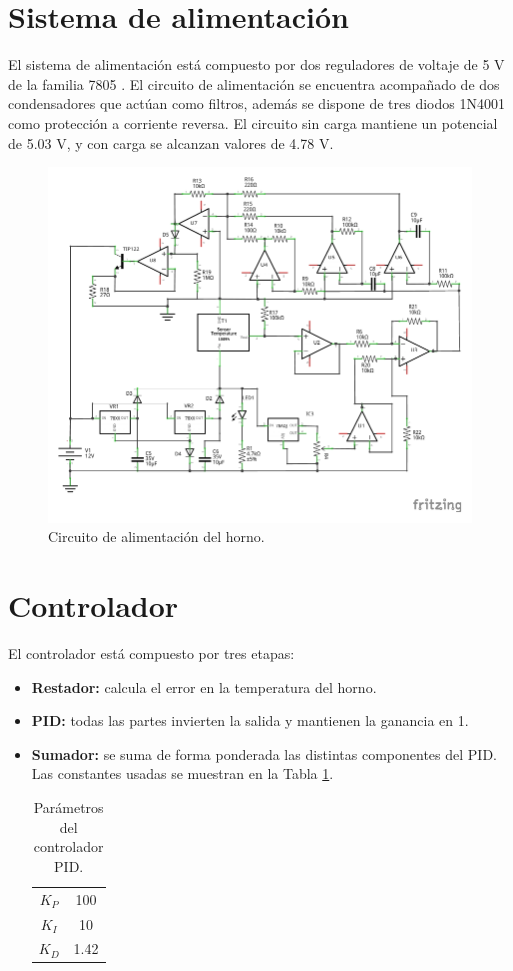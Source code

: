\documentclass{wileysix}
\begin{document}
\section{Sistema de alimentaci\'on}
El sistema de alimentaci\'on est\'a compuesto por dos reguladores de voltaje de 5 V de la familia 7805 \cite{7805}. El circuito de alimentaci\'on se encuentra acompa\~nado de dos condensadores que act\'uan como filtros, adem\'as se dispone de tres diodos 1N4001 \cite{1N4001} como protecci\'on a corriente reversa. El circuito sin carga mantiene un potencial de 5.03 V, y con carga se alcanzan valores de 4.78 V.
\begin{figure}[h]
	\centering
	\includegraphics[width=0.9\linewidth]{extras/alimentacion.pdf}
	\caption{Circuito de alimentaci\'on del horno.}
\end{figure}

\section{Controlador}
El controlador est\'a compuesto por tres etapas:
\begin{itemize}
	\item \textbf{Restador:} calcula el error en la temperatura del horno.
	\item \textbf{PID:} todas las partes invierten la salida y mantienen la ganancia en 1.
	\item \textbf{Sumador:} se suma de forma ponderada las distintas componentes del PID. Las constantes usadas se muestran en la Tabla \ref{tb: PID}.
	
	\begin{table}[h]
		\centering
		\caption{Par\'ametros del controlador PID.}
		\begin{tabular}{|c|c|}
			\hline
			$K_P$ & 100 \\
			$K_I$ & 10 \\
			$K_D$ & 1.42 \\
			\hline
		\end{tabular}
		\label{tb: PID}
	\end{table}
\end{itemize}
\end{document}
